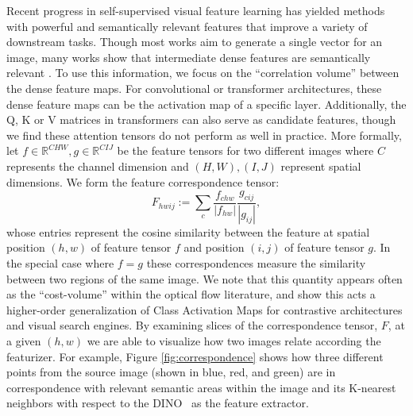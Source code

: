 \documentclass{article} \usepackage{iclr2022_conference,times}
\begin{document}
Recent progress in self-supervised visual feature learning has yielded methods with powerful and semantically relevant features that improve a variety of downstream tasks. Though most works aim to generate a single vector for an image, many works show that intermediate dense features are semantically relevant \citep{hamilton2021model,collins2018deep,cam}. To use this information, we focus on the ``correlation volume'' \citep{raft} between the dense feature maps. For convolutional or transformer architectures, these dense feature maps can be the activation map of a specific layer. Additionally, the Q, K or V matrices in transformers can also serve as candidate features, though we find these attention tensors do not perform as well in practice. More formally, let $f\in \mathbb{R}^{CHW}, g \in \mathbb{R}^{CIJ}$ be the feature tensors for two different images where $C$ represents the channel dimension and $(H,W), (I,J)$ represent spatial dimensions. We form the feature correspondence tensor:
\begin{equation}
F_{hwij} := \sum_c \frac{f_{chw}}{|f_{hw}|} \frac{g_{cij}}{|g_{ij}|}, 
\label{eqn:correspondence}
\end{equation}
whose entries represent the cosine similarity between the feature at spatial position $(h,w)$ of feature tensor $f$ and position $(i,j)$ of feature tensor $g$. In the special case where $f=g$ these correspondences measure the similarity between two regions of the same image. We note that this quantity appears often as the ``cost-volume'' within the optical flow literature, and \cite{hamilton2021model} show this acts a higher-order generalization of Class Activation Maps \citep{cam} for contrastive architectures and visual search engines. By examining slices of the correspondence tensor, $F$, at a given $(h,w)$ we are able to visualize how two images relate according the featurizer. For example, Figure \ref{fig:correspondence} shows how three different points from the source image (shown in blue, red, and green) are in correspondence with relevant semantic areas within the image and its K-nearest neighbors with respect to the DINO~\citep{dino} as the feature extractor.
\end{document}
